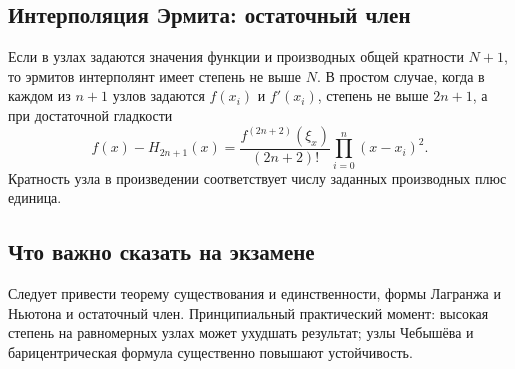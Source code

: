 \subsection{Интерполяция Эрмита: остаточный член}

Если в узлах задаются значения функции и производных общей кратности $N+1$, то
эрмитов интерполянт имеет степень не выше $N$. В простом случае, когда в каждом из
$n+1$ узлов задаются $f(x_i)$ и $f'(x_i)$, степень не выше $2n+1$, а при достаточной
гладкости
\[
    f(x)-H_{2n+1}(x)
    =\frac{f^{(2n+2)}(\xi_x)}{(2n+2)!}
      \prod_{i=0}^{n}(x-x_i)^2.
\]
Кратность узла в произведении соответствует числу заданных производных плюс единица.

\subsection{Что важно сказать на экзамене}

Следует привести теорему существования и единственности, формы Лагранжа и
Ньютона и остаточный член. Принципиальный практический момент: высокая степень на
равномерных узлах может ухудшать результат; узлы Чебышёва и барицентрическая
формула существенно повышают устойчивость.

\newpage